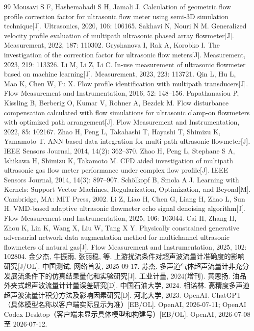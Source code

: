 \begin{thebibliography}{99}
\footnotesize
\linespread{1.0}\selectfont
\setlength{\itemsep}{0.12em}
\setlength{\parskip}{0pt}
 Mousavi S F, Hashemabadi S H, Jamali J. Calculation of geometric flow profile correction factor for ultrasonic flow meter using semi-3D simulation technique[J]. Ultrasonics, 2020, 106: 106165.
 Sakhavi N, Nouri N M. Generalized velocity profile evaluation of multipath ultrasonic phased array flowmeter[J]. Measurement, 2022, 187: 110302.
 Gryshanova I, Rak A, Korobko I. The investigation of the correction factor for ultrasonic flow meters[J]. Measurement, 2023, 219: 113326.
 Li M, Li Z, Li C. In-use measurement of ultrasonic flowmeter based on machine learning[J]. Measurement, 2023, 223: 113721.
 Qin L, Hu L, Mao K, Chen W, Fu X. Flow profile identification with multipath transducers[J]. Flow Measurement and Instrumentation, 2016, 52: 148--156.
 Papathanasiou P, Kissling B, Berberig O, Kumar V, Rohner A, Bezdek M. Flow disturbance compensation calculated with flow simulations for ultrasonic clamp-on flowmeters with optimized path arrangement[J]. Flow Measurement and Instrumentation, 2022, 85: 102167.
 Zhao H, Peng L, Takahashi T, Hayashi T, Shimizu K, Yamamoto T. ANN based data integration for multi-path ultrasonic flowmeter[J]. IEEE Sensors Journal, 2014, 14(2): 362--370.
 Zhao H, Peng L, Stephane S A, Ishikawa H, Shimizu K, Takamoto M. CFD aided investigation of multipath ultrasonic gas flow meter performance under complex flow profile[J]. IEEE Sensors Journal, 2014, 14(3): 897--907.
 Sch\"olkopf B, Smola A J. Learning with Kernels: Support Vector Machines, Regularization, Optimization, and Beyond[M]. Cambridge, MA: MIT Press, 2002.
 Li Z, Liao H, Chen G, Liang H, Zhao L, Sun H. VMD-based adaptive ultrasonic flowmeter echo signal denoising algorithm[J]. Flow Measurement and Instrumentation, 2025, 106: 103044.
 Cai H, Zhang H, Zhou K, Lin K, Wang X, Liu W, Tang X Y. Physically constrained generative adversarial network data augmentation method for multichannel ultrasonic flowmeters of natural gas[J]. Flow Measurement and Instrumentation, 2025, 102: 102804.
 金少杰, 牛振雨, 张丽稳, 等. 上游扰流条件对超声波流量计准确度的影响研究[J/OL]. 中国测试, 网络首发, 2025-09-17.
 苏杰. 多声道气体超声流量计非充分发展流条件下的仿真结果量化和实验研究[J]. 工业计量, 2024(增刊).
 黄恩扬. 油品外夹式超声波流量计计量误差研究[D]. 中国石油大学, 2024.
 相诺林. 高精度多声道超声波流量计积分方法及影响因素研究[D]. 河北大学, 2023.
 OpenAI. ChatGPT（具体模型名称以客户端实际显示为准）[EB/OL]. OpenAI, 2026-07-11; OpenAI Codex Desktop（客户端未显示具体模型和构建号）[EB/OL]. OpenAI, 2026-07-08 至 2026-07-12.
\end{thebibliography}
